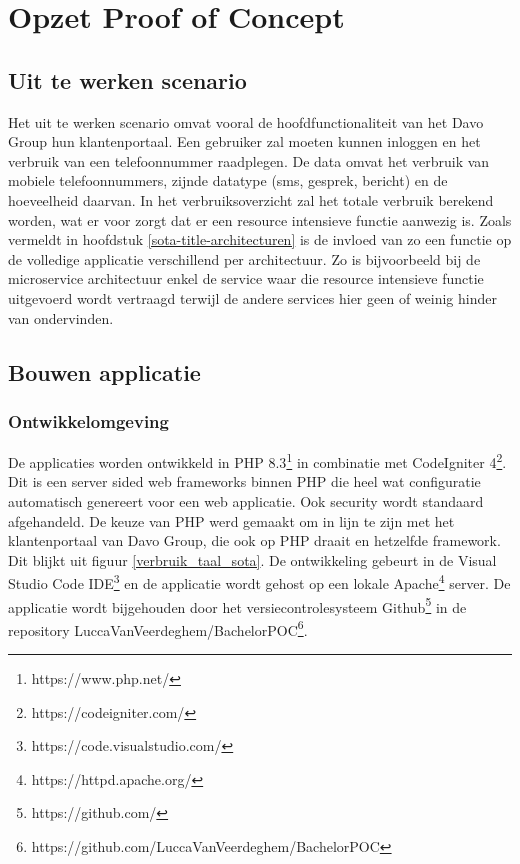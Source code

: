 \chapter{Opzet Proof of Concept}
\label{ch:opzet-poc}
\section{Uit te werken scenario}\label{poc-scenario}
Het uit te werken scenario omvat vooral de hoofdfunctionaliteit van het Davo Group hun klantenportaal. Een gebruiker zal moeten kunnen inloggen en het verbruik van een telefoonnummer raadplegen. De data omvat het verbruik van mobiele telefoonnummers, zijnde datatype (sms, gesprek, bericht) en de hoeveelheid daarvan. In het verbruiksoverzicht zal het totale verbruik berekend worden, wat er voor zorgt dat er een resource intensieve functie aanwezig is. Zoals vermeldt in hoofdstuk \ref{sota-title-architecturen} is de invloed van zo een functie op de volledige applicatie verschillend per architectuur. Zo is bijvoorbeeld bij de microservice architectuur enkel de service waar die resource intensieve functie uitgevoerd wordt vertraagd terwijl de andere services hier geen of weinig hinder van ondervinden. 

\section{Bouwen applicatie}
\subsection{Ontwikkelomgeving}\label{poc-ontwikkelomgeving}
De applicaties worden ontwikkeld in PHP 8.3\footnote{https://www.php.net/} in combinatie met CodeIgniter 4\footnote{https://codeigniter.com/}. Dit is een server sided web frameworks binnen PHP die heel wat configuratie automatisch genereert voor een web applicatie. Ook security wordt standaard afgehandeld. De keuze van PHP werd gemaakt om in lijn te zijn met het klantenportaal van Davo Group, die ook op PHP draait en hetzelfde framework. Dit blijkt uit figuur \ref{verbruik_taal_sota}. De ontwikkeling gebeurt in de Visual Studio Code IDE\footnote{https://code.visualstudio.com/} en de applicatie wordt gehost op een lokale Apache\footnote{https://httpd.apache.org/} server. De applicatie wordt bijgehouden door het versiecontrolesysteem Github\footnote{https://github.com/} in de repository LuccaVanVeerdeghem/BachelorPOC\footnote{https://github.com/LuccaVanVeerdeghem/BachelorPOC}.


